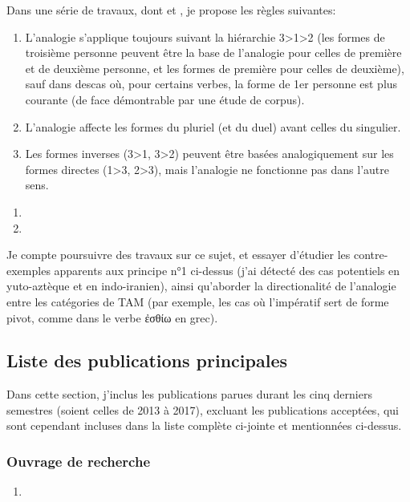 \documentclass[oldfontcommands,oneside,a4paper,11pt]{article}
\newcommand{\grec}[1]{{\mleccha #1}}
\begin{document}
Dans une série de travaux, dont \citet{jacques18directionality} et \citet{jacques16ebde}, je propose les règles suivantes:

\begin{enumerate}
\item L'analogie s'applique toujours suivant la hiérarchie 3>1>2 (les formes de troisième personne peuvent être la base de l'analogie pour celles de première et de deuxième personne, et les formes de première pour celles de deuxième), sauf dans descas où, pour certains verbes, la forme de 1er personne est plus courante (de face démontrable par une étude de corpus).
\item L'analogie affecte les formes du pluriel (et du duel) avant celles du singulier.
\item Les formes inverses (3>1, 3>2) peuvent être basées analogiquement sur les formes directes (1>3, 2>3), mais l'analogie ne fonctionne pas dans l'autre sens.
\end{enumerate}

\begin{enumerate}
 \item  {}
 \item {}
\end{enumerate}

Je compte poursuivre des travaux sur ce sujet, et essayer d'étudier les contre-exemples apparents aux principe n°1 ci-dessus (j'ai détecté des cas potentiels en yuto-aztèque et en indo-iranien), ainsi qu'aborder la directionalité de l'analogie entre les catégories de TAM (par exemple, les cas où l'impératif sert de forme pivot, comme dans le verbe \grec{ἐσθίω} en grec).

\subsection{Liste des publications principales}
Dans cette section, j'inclus les publications parues durant les cinq derniers semestres (soient celles de 2013 à 2017), excluant les publications acceptées, qui sont cependant incluses dans la liste complète ci-jointe et mentionnées ci-dessus.
%



\subsubsection{Ouvrage de recherche}
\begin{enumerate}
 \item  {}     
\end{enumerate}
\end{document}
